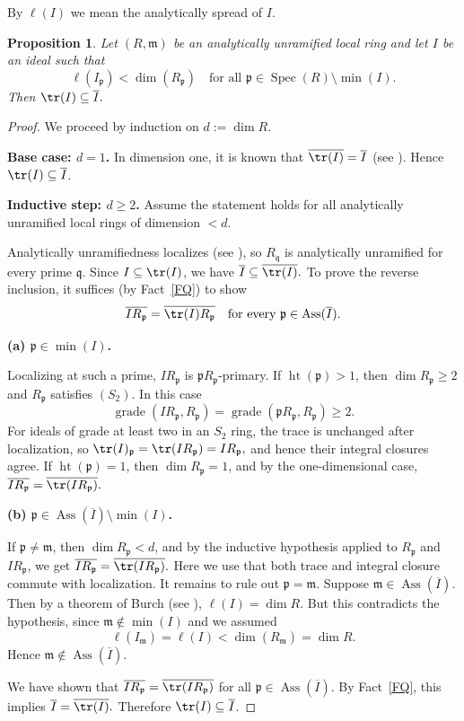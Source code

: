 \documentclass[11pt,a4paper]{amsart}
\numberwithin{equation}{section}
\newtheorem{proposition}[theorem]{Proposition}
\DeclareMathOperator{\Ass}{Ass}
\DeclareMathOperator{\grade}{grade}
\DeclareMathOperator{\Spec}{Spec}
\DeclareMathOperator{\Ht}{ht}
\newcommand{\fm}{\mathfrak{m}}
\newcommand{\fp}{\mathfrak{p}}
\newcommand{\fq}{\mathfrak{q}}
\begin{document}
By $\ell(I)$ we mean the analytically spread of $I$.

\begin{proposition}\label{5.4}
	Let $(R,\mathfrak m)$ be an analytically unramified local ring and let $I$ be an ideal such that
	\[
	\ell(I_\fp) < \dim(R_\fp)\quad \text{for all } \fp \in \Spec(R)\setminus \min(I).
	\]
	Then
	\(
	\tr(I)\subseteq \overline{I}.
	\)
\end{proposition}

\begin{proof}
	We proceed by induction on $d:=\dim R$.
	
	\medskip
	\noindent\textbf{Base case: $d=1$.}
	In dimension one, it is known that
	\(
	\overline{\tr(I)}=\overline{I}
	\)
	(see \cite[2.4(3)]{lindo}). Hence $\tr(I)\subseteq \overline{I}$.
	
	\medskip
	\noindent\textbf{Inductive step: $d\ge 2$.}
	Assume the statement holds for all analytically unramified local rings of dimension $<d$.
	
	Analytically unramifiedness localizes (see \cite[Prop.~9.1.4]{HS}), so $R_\fq$ is analytically unramified for every prime $\fq$. Since $I\subseteq \tr(I)$, we have
	\(
	\overline{I}\subseteq \overline{\tr(I)}.
	\)
	To prove the reverse inclusion, it suffices (by Fact~\ref{FQ}) to show
	\[
	\overline{IR_\fp}=\overline{\tr(I)R_\fp}
	\quad\text{for every }\fp\in \Ass(\overline{I}).
	\]
	
	\medskip
	\noindent\textbf{(a) $\fp\in \min(I)$.}
	
	Localizing at such a prime, $IR_\fp$ is $\fp R_\fp$-primary.  
If $\Ht(\fp)>1$, then $\dim R_\fp\ge 2$ and $R_\fp$ satisfies $(S_2)$. In this case
	\[
	\grade(IR_\fp,R_\fp)=\grade(\fp R_\fp,R_\fp)\ge 2.
	\]
	For ideals of grade at least two in an $S_2$ ring, the trace is unchanged after localization, so
	\(
	\tr(I)_\fp=\tr(IR_\fp)=IR_\fp,
	\)
	and hence their integral closures agree.
If $\Ht(\fp)=1$, then $\dim R_\fp=1$, and by the one-dimensional case,
	\(
	\overline{IR_\fp}=\overline{\tr(IR_\fp)}.
	\)
	
	\medskip
	\noindent\textbf{(b) $\fp\in \Ass(\overline{I})\setminus \min(I)$.}
	
	If $\fp\ne \fm$, then $\dim R_\fp<d$, and by the inductive hypothesis applied to $R_\fp$ and $IR_\fp$, we get
	\(
	\overline{IR_\fp}=\overline{\tr(IR_\fp)}.
	\)
	Here we use that both trace and integral closure commute with localization.
It remains to rule out $\fp=\fm$. Suppose $\fm\in \Ass(\overline{I})$. Then by a theorem of Burch (see \cite[Prop.~5.4.7]{HS}),
	\(
	\ell(I)=\dim R.
	\)
	But this contradicts the hypothesis, since $\fm\notin \min(I)$ and we assumed
	\[
	\ell(I_\fm)=\ell(I)<\dim(R_\fm)=\dim R.
	\]
	Hence $\fm\notin \Ass(\overline{I})$.
	
	\medskip
	We have shown that $\overline{IR_\fp}=\overline{\tr(IR_\fp)}$ for all $\fp\in \Ass(\overline{I})$. By Fact~\ref{FQ}, this implies
	\(
	\overline{I}=\overline{\tr(I)}.
	\)
	Therefore $\tr(I)\subseteq \overline{I}$.
\end{proof}
\end{document}
